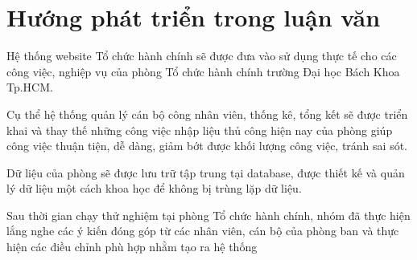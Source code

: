 \section{Hướng phát triển trong luận văn}
Hệ thống website Tổ chức hành chính sẽ được đưa vào sử dụng thực tế cho các công việc, nghiệp vụ của phòng Tổ chức hành chính trường Đại học Bách Khoa Tp.HCM.

Cụ thể hệ thống quản lý cán bộ công nhân viên, thống kê, tổng kết sẽ được triển khai và thay thế những công việc nhập liệu thủ công hiện nay của phòng giúp công việc thuận tiện, dễ dàng, giảm bớt được khối lượng công việc, tránh sai sót.

Dữ liệu của phòng sẽ được lưu trữ tập trung tại database, được thiết kế và quản lý dữ liệu một cách khoa học để không bị trùng lặp dữ liệu.

Sau thời gian chạy thử nghiệm tại phòng Tổ chức hành chính, nhóm đã thực hiện lắng nghe các ý kiến đóng góp từ các nhân viên, cán bộ của phòng ban và thực hiện các điều chỉnh phù hợp nhằm tạo ra hệ thống 